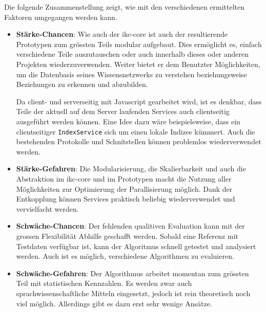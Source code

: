 
Die folgende Zusammenstellung zeigt, wie mit den verschiedenen ermittelten Faktoren umgegangen werden kann.


\begin{itemize}
    \item \textbf{Stärke-Chancen}: Wie auch der \gls{ikc-core} ist auch der resultierende Prototypen zum grössten Teils modular aufgebaut. Dies ermöglicht es, einfach verschiedene Teile auszutauschen oder auch innerhalb dieses oder anderen Projekten wiederzuverwenden. Weiter bietet er dem Benutzter Möglichkeiten, um die Datenbasis seines Wissensnetzwerks zu verstehen beziehungsweise Beziehungen zu erkennen und abzubilden.
    
    Da client- und serverseitig mit Javascript gearbeitet wird, ist es denkbar, dass Teile der aktuell auf dem Server laufenden Services auch clientseitig ausgeführt werden können. Eine Idee dazu wäre beispielsweise, dass ein clientseitiger \texttt{IndexService} sich um einen lokale Indizes kümmert. Auch die bestehenden Protokolle und Schnitstellen können problemlos wiederverwendet werden.
    \item \textbf{Stärke-Gefahren}: Die Modularisierung, die Skalierbarkeit und auch die Abstraktion im \gls{ikc-core} und im Prototypen macht die Nutzung aller Möglichkeiten zur Optimierung der Parallisierung möglich. Dank der Entkopplung können Services praktisch beliebig wiederverwendet und vervielfacht werden.
    \item \textbf{Schwäche-Chancen}: Der fehlenden qualitiven Evaluation kann mit der grossen Flexibilität Abhilfe geschafft werden. Sobald eine Referenz mit Testdaten verfügbar ist, kann der Algoritmus schnell getestet und analysiert werden. Auch ist es möglich, verschiedene Algorithmen zu evaluieren.
    \item \textbf{Schwäche-Gefahren}: Der Algorithmus arbeitet momentan zum grössten Teil mit statistischen Kennzahlen. Es werden zwar auch sprachwissenschaftliche Mitteln eingesetzt, jedoch ist rein theoretisch noch viel möglich. Allerdings gibt es dazu erst sehr wenige Ansätze.
\end{itemize}

